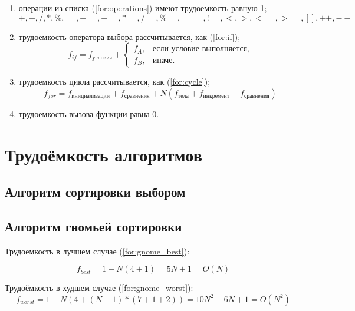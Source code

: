 \begin{enumerate}
	\item операции из списка (\ref{for:operations}) имеют трудоемкость равную 1;
	\begin{equation}
		\label{for:operations}
		+, -, /, *, \%, =, +=, -=, *=, /=, \%=, ==, !=, <, >, <=, >=, [], ++, {-}-
	\end{equation}
	\item трудоемкость оператора выбора  рассчитывается, как (\ref{for:if});
	\begin{equation}
		\label{for:if}
		f_{if} = f_{\text{условия}} +
		\begin{cases}
			f_A, & \text{если условие выполняется,}\\
			f_B, & \text{иначе.}
		\end{cases}
	\end{equation}
	\item трудоемкость цикла рассчитывается, как (\ref{for:cycle});
	\begin{equation}
		\label{for:cycle}
		f_{for} = f_{\text{инициализации}} + f_{\text{сравнения}} + N(f_{\text{тела}} + f_{\text{инкремент}} + f_{\text{сравнения}})
	\end{equation}
	\item трудоемкость вызова функции равна 0.
\end{enumerate}

\section{Трудоёмкость алгоритмов}

\subsection{Алгоритм сортировки выбором}

\subsection{Алгоритм гномьей сортировки}

Трудоемкость в лучшем случае (\ref{for:gnome_best}):

\begin{equation}
	\label{for:gnome_best}
    f_{best} = 1 + N(4 + 1) = 5N + 1 = O(N)
\end{equation}

Трудоёмкость в худшем случае (\ref{for:gnome_worst}):
\begin{equation}
	\label{for:gnome_worst}
    f_{worst} = 1 + N(4 + (N - 1) * (7 + 1 + 2)) = 10N^2 - 6N + 1 = O(N^2)
\end{equation}

